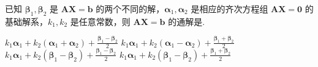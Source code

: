 	\begin{titwo}
		已知 $\bm \beta_{1},\bm \beta_{2}$ 是 $\bm A \bm X = \bm b$ 的两个不同的解，$\bm \alpha_{1},\bm \alpha_{2}$ 是相应的齐次方程组 $\bm A \bm X = \bm 0$ 的基础解系，$k_{1},k_{2}$ 是任意常数，则 $\bm A \bm X = \bm b$ 的通解是\kuo.

		\onech%
		{$k_{1} \bm \alpha_{1} + k_{2} ( \bm \alpha_{1} + \bm \alpha_{2} ) + \frac{\bm \beta_{1} - \bm \beta_{2}}{2}$}%
		{$k_{1} \bm \alpha_{1} + k_{2} ( \bm \alpha_{1} - \bm \alpha_{2} ) + \frac{\bm \beta_{1} + \bm \beta_{2}}{2}$}%
		{$k_{1} \bm \alpha_{1} + k_{2} ( \bm \beta_{1} - \bm \beta_{2} ) + \frac{\bm \beta_{1} - \bm \beta_{2}}{2}$}%
		{$k_{1} \bm \alpha_{1} + k_{2} ( \bm \beta_{1} - \bm \beta_{2} ) + \frac{\bm \beta_{1} + \bm \beta_{2}}{2}$}
	\end{titwo}

